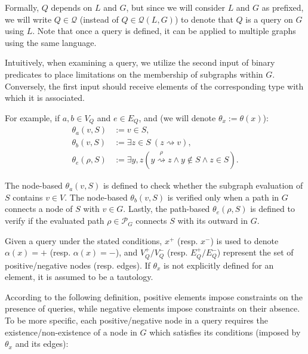 \documentclass[mathematics,article,submit,pdftex,moreauthors]{Definitions/mdpi}
\begin{document}
Formally, $Q$ depends on $L$ and $G$, but since we will consider $L$ and $G$ as prefixed, we will write $Q \in \mathcal{Q} $ (instead of $Q \in \mathcal{Q}(L, G) $) to denote that $Q $ is a query on $G$ using $L $.  Note that once a query is defined, it can be applied to multiple graphs using the same language.

Intuitively, when examining a query, we utilize the second input of binary predicates to place limitations on the membership of subgraphs within $ G $. Conversely, the first input should receive elements of the corresponding type with which it is associated. 

For example, if $a,b\in V_Q$ and $e\in E_Q$, and (we will denote $\theta_x:=\theta(x)$):
\begin{align*}
\theta_a(v,S)&:=v\in S,\\
\theta_b(v,S)&:=\exists z\in S\ (z \stackrel{}{\rightsquigarrow} v),\\
\theta_e(\rho,S)&:=\exists y,z (y \stackrel{\rho}{\rightsquigarrow} z \wedge y \notin S\wedge z\in S).
\end{align*}

The node-based $\theta_a(v,S)$ is defined to check whether the subgraph evaluation of $S$ contains $v\in V$. The node-based $\theta_b(v,S)$ is verified only when a path in $G$ connects a node of $S$ with $v\in G$. Lastly, the path-based $\theta_e(\rho,S)$ is defined to verify if the evaluated path $\rho\in \mathcal{P}_G$ connects $S$ with its outward in $G$.

Given a query under the stated conditions, $x^+$ (resp. $x^-$) is used to denote $ \alpha (x) = + $ (resp. $ \alpha (x) = - $), and $V_Q^+/V_Q^-$ (resp. $E_Q^+/E_Q^-$) represent the set of positive/negative nodes (resp. edges). If $ \theta_x $ is not explicitly defined for an element, it is assumed to be a tautology.

According to the following definition, positive elements impose constraints on the presence of queries, while negative elements impose constraints on their absence. To be more specific, each positive/negative node in a query requires the existence/non-existence of a node in $G$ which satisfies its conditions (imposed by $\theta_x$ and its edges):
\end{document}
